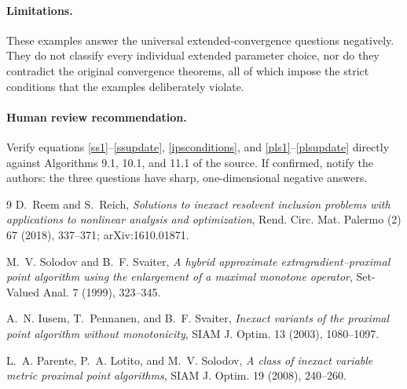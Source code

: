 \documentclass[11pt]{article}
\begin{document}
\paragraph{Limitations.}
These examples answer the universal extended-convergence questions
negatively.  They do not classify every individual extended parameter choice,
nor do they contradict the original convergence theorems, all of which impose
the strict conditions that the examples deliberately violate.

\paragraph{Human review recommendation.}
Verify equations \eqref{ss1}--\eqref{ssupdate}, \eqref{ipsconditions}, and
\eqref{pls1}--\eqref{plsupdate} directly against Algorithms 9.1, 10.1, and
11.1 of the source.  If confirmed, notify the authors: the three questions
have sharp, one-dimensional negative answers.

\begin{thebibliography}{9}
D.~Reem and S.~Reich,
\emph{Solutions to inexact resolvent inclusion problems with applications to
nonlinear analysis and optimization}, Rend. Circ. Mat. Palermo (2) 67 (2018),
337--371; arXiv:1610.01871.

M.~V. Solodov and B.~F. Svaiter,
\emph{A hybrid approximate extragradient--proximal point algorithm using the
enlargement of a maximal monotone operator}, Set-Valued Anal. 7 (1999),
323--345.

A.~N. Iusem, T.~Pennanen, and B.~F. Svaiter,
\emph{Inexact variants of the proximal point algorithm without monotonicity},
SIAM J. Optim. 13 (2003), 1080--1097.

L.~A. Parente, P.~A. Lotito, and M.~V. Solodov,
\emph{A class of inexact variable metric proximal point algorithms},
SIAM J. Optim. 19 (2008), 240--260.
\end{thebibliography}
\end{document}
